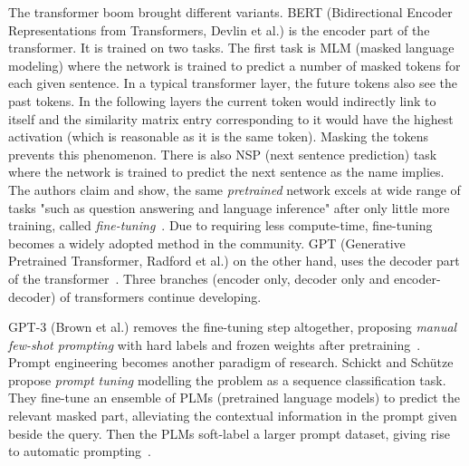 \documentclass{book}
\numberwithin{equation}{subsection}
\begin{document}
The transformer boom brought different variants. BERT (Bidirectional Encoder Representations from Transformers, Devlin et al.) is the encoder part of the transformer. It is trained on two tasks. The first task is MLM (masked language modeling) where the network is trained to predict a number of masked tokens for each given sentence. In a typical transformer layer, the future tokens also see the past tokens. In the following layers the current token would indirectly link to itself and the similarity matrix entry corresponding to it would have the highest activation (which is reasonable as it is the same token). Masking the tokens prevents this phenomenon. There is also NSP (next sentence prediction) task where the network is trained to predict the next sentence as the name implies. The authors claim and show, the same \textit{pretrained} network excels at wide range of tasks "such as question answering and language inference" after only little more training, called \textit{fine-tuning}~\cite{devlin_bert_2019}. Due to requiring less compute-time, fine-tuning becomes a widely adopted method in the community. GPT (Generative Pretrained Transformer, Radford et al.) on the other hand, uses the decoder part of the transformer~\cite{radford_improving_2018}. Three branches (encoder only, decoder only and encoder-decoder) of transformers continue developing.

GPT-3 (Brown et al.) removes the fine-tuning step altogether, proposing \textit{manual few-shot prompting} with hard labels and frozen weights after pretraining~\cite{brown_language_2020}. Prompt engineering becomes another paradigm of research. Schickt and Schütze propose \textit{prompt tuning} modelling the problem as a sequence classification task. They fine-tune an ensemble of PLMs (pretrained language models) to predict the relevant masked part, alleviating the contextual information in the prompt given beside the query. Then the PLMs soft-label a larger prompt dataset, giving rise to automatic prompting~\cite{schick_exploiting_2021}.


\end{document}
